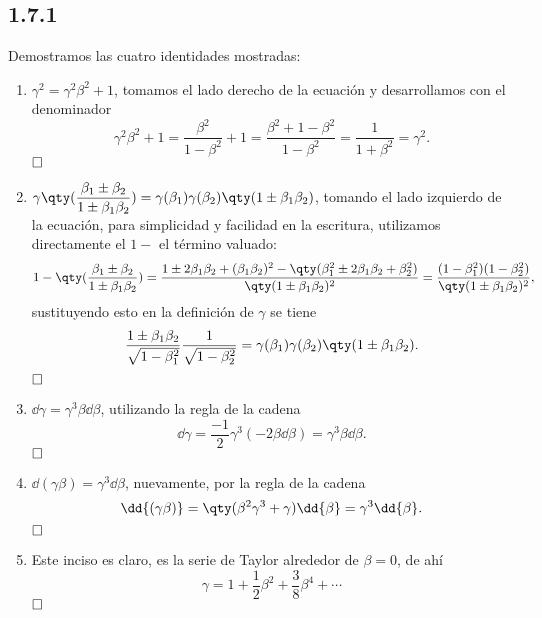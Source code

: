 \subsection{1.7.1}
Demostramos las cuatro identidades mostradas:
\begin{enumerate}
	\item $\gamma ^2 = \gamma ^2 \beta ^2 + 1$, tomamos el lado derecho de la ecuación y desarrollamos con el denominador
	$$\gamma ^2 \beta ^2 + 1 = \frac{\beta ^2}{1 - \beta ^2} + 1 = \frac{\beta ^2 + 1 - \beta ^2}{1 - \beta ^2} = \frac{1}{1 + \beta ^2} = \gamma ^2 .$$
	$\hfill \square$
	\item $\gamma \qty(\displaystyle\frac{\beta _1 \pm \beta _2}{1 \pm \beta _1 \beta _2}) = \gamma (\beta _1) \gamma (\beta _2) \qty(1 \pm \beta _1 \beta _2)$, tomando el lado izquierdo de la ecuación, para simplicidad y facilidad en la escritura, utilizamos directamente el $1-$ el término valuado:	
	$$
			1-\qty(\frac{\beta _1 \pm \beta _2}{1\pm \beta _1 \beta _2}) = \frac{1\pm 2\beta _1 \beta _2 + (\beta _1 \beta _2)^2 - \qty(\beta _1 ^2 \pm 2\beta _1 \beta _2 + \beta _2 ^2)}{\qty(1 \pm \beta _1 \beta _2)^2} = \frac{(1 - \beta _1 ^2)(1 - \beta _2 ^2)}{\qty(1 \pm \beta _1 \beta _2)^2},
	$$
	sustituyendo esto en la definición de $\gamma$ se tiene 
	$$
		\frac{1 \pm \beta _1 \beta _2}{\sqrt{1 - \beta _1 ^2}} \frac{1}{\sqrt{1 - \beta _2 ^2}} = \gamma (\beta _1) \gamma (\beta _2) \qty(1 \pm \beta _1 \beta _2).
	$$
	$\hfill \square$
	\item $\dd{\gamma} = \gamma ^3 \beta \dd{\beta}$, utilizando la regla de la cadena
	$$
		\dd{\gamma} = \frac{-1}{2} \gamma ^3 (-2\beta \dd{\beta}) = \gamma ^3 \beta \dd{\beta} .
	$$
	$\hfill \square$
	\item $\dd{(\gamma \beta)} = \gamma ^3 \dd{\beta}$, nuevamente, por la regla de la cadena
	$$
		\dd{(\gamma \beta)}	= \qty(\beta ^2 \gamma ^3 + \gamma) \dd{\beta} = \gamma ^3 \dd{\beta}.
	$$
	$\hfill \square$
	\item Este inciso es claro, es la serie de Taylor alrededor de $\beta = 0$, de ahí
	$$
		\gamma = 1 + \frac{1}{2} \beta ^2 + \frac{3}{8} \beta ^4 + \cdots	
	$$
	$\hfill \square$
\end{enumerate}


